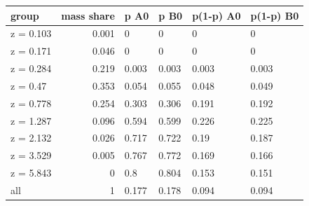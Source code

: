 \begingroup\small
\setlength{\tabcolsep}{3pt}
\renewcommand{\arraystretch}{1.04}
\begin{tabularx}{\linewidth}{XrXXXX}
\toprule
group & mass share & p A0 & p B0 & p(1-p) A0 & p(1-p) B0 \\
\midrule
z = 0.103 & 0.001 & 0 & 0 & 0 & 0 \\
z = 0.171 & 0.046 & 0 & 0 & 0 & 0 \\
z = 0.284 & 0.219 & 0.003 & 0.003 & 0.003 & 0.003 \\
z = 0.47 & 0.353 & 0.054 & 0.055 & 0.048 & 0.049 \\
z = 0.778 & 0.254 & 0.303 & 0.306 & 0.191 & 0.192 \\
z = 1.287 & 0.096 & 0.594 & 0.599 & 0.226 & 0.225 \\
z = 2.132 & 0.026 & 0.717 & 0.722 & 0.19 & 0.187 \\
z = 3.529 & 0.005 & 0.767 & 0.772 & 0.169 & 0.166 \\
z = 5.843 & 0 & 0.8 & 0.804 & 0.153 & 0.151 \\
all & 1 & 0.177 & 0.178 & 0.094 & 0.094 \\
\bottomrule
\end{tabularx}
\endgroup
